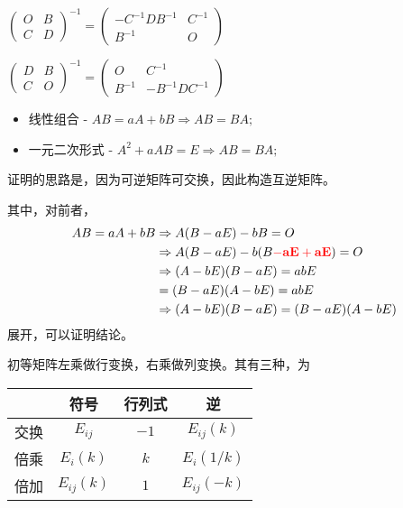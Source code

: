 \begin{itemize}
\begin{itemize}
        $ \begin{pmatrix}
        O & B \\ C & D
        \end{pmatrix}^{-1} = 
        \begin{pmatrix}
        -C^{-1}DB^{-1} & C^{-1} \\ B^{-1} & O
        \end{pmatrix} $ 
        
        $ \begin{pmatrix}
        D & B \\ C & O
        \end{pmatrix}^{-1} = 
        \begin{pmatrix}
        O & C^{-1} \\ B^{-1} & -B^{-1}DC^{-1}
        \end{pmatrix} $ 
    \end{itemize}
\end{itemize}


\begin{itemize}
    \item 线性组合 - $ AB = aA+bB \Rightarrow AB = BA; $ 
    \item 一元二次形式 - $ A^2 + aAB = E \Rightarrow AB = BA; $
\end{itemize}

证明的思路是，因为可逆矩阵可交换，因此构造互逆矩阵。

其中，对前者，
\begin{equation*}
    \begin{aligned}
        AB = aA + bB &\Rightarrow A(B-aE) - bB = O \\ 
        &\Rightarrow A(B-aE) - b(B\textcolor{red}{\bf{-aE+aE}}) = O \\ 
        &\Rightarrow (A-bE)(B-aE) = abE \\
        &= (B-aE)(A-bE) = abE\\ 
        &\Rightarrow (A-bE)(B-aE) = (B-aE)(A-bE)\\
    \end{aligned}
\end{equation*}
展开，可以证明结论。


初等矩阵左乘做行变换，右乘做列变换。其有三种，为

\begin{table}[!htbp]\centering
    \begin{tabular}{|c|c|c|c|}
    \hline
            &  符号  & 行列式 & 逆                \\ \hline
    交换&$ E_{ij} $    & $ -1 $   & $ E_{ij}(k) $       \\ \hline
    倍乘&$ E_{i}(k) $  & $ k  $   & $ E_{i}(1/k) $ \\ \hline
    倍加&$ E_{ij}(k) $ & $ 1  $   & $ E_{ij}(-k) $      \\ \hline
    \end{tabular}
\end{table}

